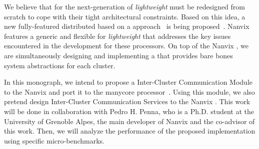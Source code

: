 
	We believe that \oses for the next-generation of \textit{lightweight} \manycores must be
	redesigned from scratch to cope with their tight architectural constraints.
	Based on this idea, a new fully-featured distributed \os based on a \multikernel approach~\cite{Baumann2009}
	is being proposed~\cite{penna2017-1,penna2017-2,penna2019}.
	Nanvix features a generic and flexible \hal for \textit{lightweight} \manycores that
	addresses the key issues encountered in the development for these processors.
	On top of the Nanvix \hal, we are simultaneously designing and implementing a \microkernel
	that provides bare bones system abstractions for each cluster.

	In this monograph, we intend to propose a Inter-Cluster Communication Module to the Nanvix \hal
	and port it to the \mppa manycore processor~\cite{DeDinechin2013-1}.
	Using this module, we also pretend design Inter-Cluster Communication Services to the Nanvix \microkernel.
	This work will be done in collaboration with Pedro H. Penna, who is a Ph.D. student at the
	University of Grenoble Alpes, the main developer of Nanvix and the co-advisor of this work.
	Then, we will analyze the performance of the proposed implementation using specific micro-benchmarks.

